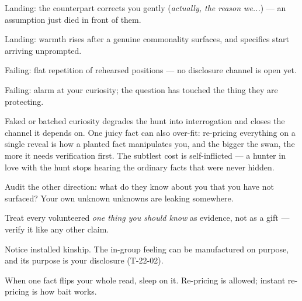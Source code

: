\begin{feedback}
  \item Landing: the counterpart corrects you gently (\emph{actually, the reason we...}) --- an assumption just died in front of them.
  \item Landing: warmth rises after a genuine commonality surfaces, and specifics start arriving unprompted.
  \item Failing: flat repetition of rehearsed positions --- no disclosure channel is open yet.
  \item Failing: alarm at your curiosity; the question has touched the thing they are protecting.
\end{feedback}
\begin{failure}
Faked or batched curiosity degrades the hunt into interrogation and closes the channel it depends on. One juicy fact can also over-fit: re-pricing everything on a single reveal is how a planted fact manipulates you, and the bigger the swan, the more it needs verification first. The subtlest cost is self-inflicted --- a hunter in love with the hunt stops hearing the ordinary facts that were never hidden.
\end{failure}
\begin{countermeasures}
  \item Audit the other direction: what do they know about you that you have not surfaced? Your own unknown unknowns are leaking somewhere.
  \item Treat every volunteered \emph{one thing you should know} as evidence, not as a gift --- verify it like any other claim.
  \item Notice installed kinship. The in-group feeling can be manufactured on purpose, and its purpose is your disclosure (T-22-02).
  \item When one fact flips your whole read, sleep on it. Re-pricing is allowed; instant re-pricing is how bait works.
\end{countermeasures}

\seesources
{}
